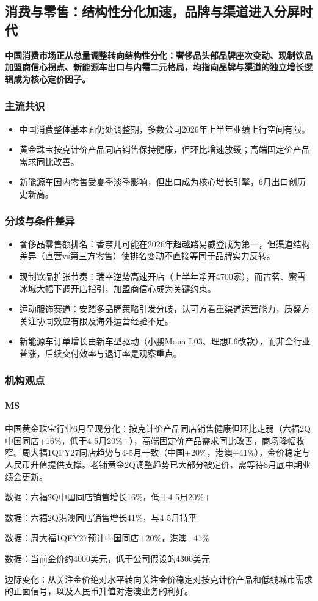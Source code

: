 \documentclass[11pt]{ctexart}
\begin{document}
\subsection{消费与零售：结构性分化加速，品牌与渠道进入分屏时代}
\textbf{中国消费市场正从总量调整转向结构性分化：奢侈品头部品牌座次变动、现制饮品加盟商信心拐点、新能源车出口与内需二元格局，均指向品牌与渠道的独立增长逻辑成为核心定价因子。}
\subsubsection*{主流共识}
\begin{itemize}
  \item 中国消费整体基本面仍处调整期，多数公司2026年上半年业绩上行空间有限。
  \item 黄金珠宝按克计价产品同店销售保持健康，但环比增速放缓；高端固定价产品需求同比改善。
  \item 新能源车国内零售受夏季淡季影响，但出口成为核心增长引擎，6月出口创历史新高。
\end{itemize}
\subsubsection*{分歧与条件差异}
\begin{itemize}
  \item 奢侈品零售额排名：香奈儿可能在2026年超越路易威登成为第一，但渠道结构差异（直营vs第三方零售）使排名变动不直接等同于品牌实力反转。
  \item 现制饮品扩张节奏：瑞幸逆势高速开店（上半年净开4700家），而古茗、蜜雪冰城大幅下调开店指引，加盟商信心成为关键约束。
  \item 运动服饰赛道：安踏多品牌策略引发分歧，认可方看重渠道运营能力，质疑方关注协同效应有限及海外运营经验不足。
  \item 新能源车订单增长由新车型驱动（小鹏Mona L03、理想L6改款），而非全行业普涨，后续交付效率与退订率是观察重点。
\end{itemize}
\subsubsection*{机构观点}
\paragraph{MS} 中国黄金珠宝行业6月呈现分化：按克计价产品同店销售健康但环比走弱（六福2Q中国同店+16\%，低于4-5月20\%+），高端固定价产品需求同比改善，商场降幅收窄。周大福1QFY27同店趋势与4-5月一致（中国+20\%，港澳+41\%），金价稳定与人民币升值提供支撑。老铺黄金2Q调整趋势已大部分被定价，需等待8月底中期业绩会更新。
{\small\color{refgray}数据：六福2Q中国同店销售增长16\%，低于4-5月20\%+\par}
{\small\color{refgray}数据：六福2Q港澳同店销售增长41\%，与4-5月持平\par}
{\small\color{refgray}数据：周大福1QFY27预计中国同店+20\%，港澳+41\%\par}
{\small\color{refgray}数据：当前金价约4000美元，低于公司假设的4300美元\par}
{\small\color{refgray}边际变化：从关注金价绝对水平转向关注金价稳定对按克计价产品和低线城市需求的正面信号，以及人民币升值对港澳业务的利好。\par}
\end{document}

